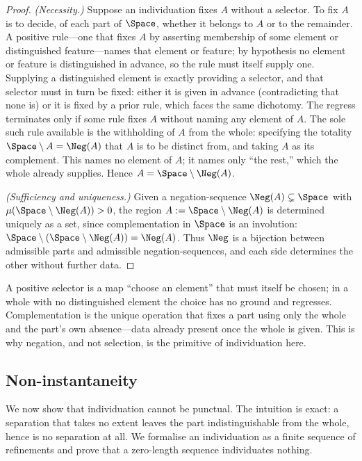 \begin{proof}
\emph{(Necessity.)} Suppose an individuation fixes $A$ without a selector. To
fix $A$ is to decide, of each part of $\Space$, whether it belongs to $A$ or to
the remainder. A positive rule---one that fixes $A$ by asserting membership of
some element or distinguished feature---names that element or feature; by
hypothesis no element or feature is distinguished in advance, so the rule must
itself supply one. Supplying a distinguished element is exactly providing a
selector, and that selector must in turn be fixed: either it is given in advance
(contradicting that none is) or it is fixed by a prior rule, which faces the same
dichotomy. The regress terminates only if some rule fixes $A$ without naming any
element of $A$. The sole such rule available is the withholding of $A$ from the
whole: specifying the totality $\Space\setminus A=\Neg(A)$ that $A$ is to be
distinct from, and taking $A$ as its complement. This names no element of $A$;
it names only ``the rest,'' which the whole already supplies. Hence
$A=\Space\setminus\Neg(A)$.

\emph{(Sufficiency and uniqueness.)} Given a negation-sequence
$\Neg(A)\subsetneq\Space$ with $\mu(\Space\setminus\Neg(A))>0$, the region
$A:=\Space\setminus\Neg(A)$ is determined uniquely as a set, since complementation
in $\Space$ is an involution: $\Space\setminus(\Space\setminus\Neg(A))=\Neg(A)$.
Thus $\Neg$ is a bijection between admissible parts and admissible
negation-sequences, and each side determines the other without further data.
\end{proof}

\begin{remark}
\label{rem:regress}
A positive selector is a map ``choose an element'' that must itself be chosen; in
a whole with no distinguished element the choice has no ground and regresses.
Complementation is the unique operation that fixes a part using only the whole
and the part's own absence---data already present once the whole is given. This
is why negation, and not selection, is the primitive of individuation here.
\end{remark}

\subsection{Non-instantaneity}

We now show that individuation cannot be punctual. The intuition is exact: a
separation that takes no extent leaves the part indistinguishable from the
whole, hence is no separation at all. We formalise an individuation as a finite
sequence of refinements and prove that a zero-length sequence individuates
nothing.

